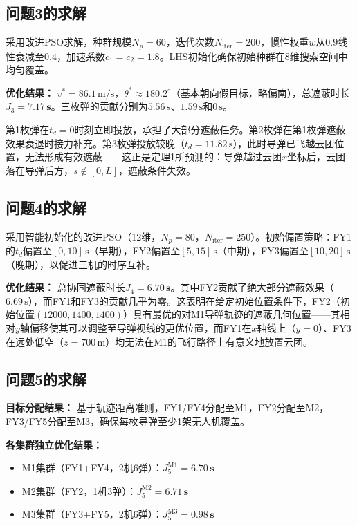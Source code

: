 \documentclass[12pt,a4paper]{ctexart}
\begin{document}
\subsection{问题3的求解}

采用改进PSO求解，种群规模$N_p = 60$，迭代次数$N_{\text{iter}} = 200$，惯性权重$w$从$0.9$线性衰减至$0.4$，加速系数$c_1 = c_2 = 1.8$。LHS初始化确保初始种群在8维搜索空间中均匀覆盖。

\textbf{优化结果：} $v^* = 86.1\,\text{m/s}$，$\theta^* \approx 180.2^\circ$（基本朝向假目标，略偏南），总遮蔽时长$J_3 = \mathbf{7.17\,\text{s}}$。三枚弹的贡献分别为$5.56\,\text{s}$、$1.59\,\text{s}$和$0\,\text{s}$。

第1枚弹在$t_d=0$时刻立即投放，承担了大部分遮蔽任务。第2枚弹在第1枚弹遮蔽效果衰退时接力补充。第3枚弹投放较晚（$t_d=11.82\,\text{s}$），此时导弹已飞越云团位置，无法形成有效遮蔽——这正是定理1所预测的：导弹越过云团$x$坐标后，云团落在导弹后方，$s \notin [0,L]$，遮蔽条件失效。

\subsection{问题4的求解}

采用智能初始化的改进PSO（12维，$N_p=80$，$N_{\text{iter}}=250$）。初始偏置策略：FY1的$t_d$偏置至$[0,10]\,\text{s}$（早期），FY2偏置至$[5,15]\,\text{s}$（中期），FY3偏置至$[10,20]\,\text{s}$（晚期），以促进三机的时序互补。

\textbf{优化结果：} 总协同遮蔽时长$J_4 = \mathbf{6.70\,\text{s}}$。其中FY2贡献了绝大部分遮蔽效果（$6.69\,\text{s}$），而FY1和FY3的贡献几乎为零。这表明在给定初始位置条件下，FY2（初始位置$(12000,1400,1400)$）具有最优的对M1导弹轨迹的遮蔽几何位置——其相对$y$轴偏移使其可以调整至导弹视线的更优位置，而FY1在$x$轴线上（$y=0$）、FY3在远处低空（$z=700\,\text{m}$）均无法在M1的飞行路径上有意义地放置云团。

\subsection{问题5的求解}

\textbf{目标分配结果：} 基于轨迹距离准则，FY1/FY4分配至M1，FY2分配至M2，FY3/FY5分配至M3，确保每枚导弹至少1架无人机覆盖。

\textbf{各集群独立优化结果：}
\begin{itemize}
    \item M1集群（FY1+FY4，2机6弹）：$J_5^{\text{M1}} = \mathbf{6.70\,\text{s}}$
    \item M2集群（FY2，1机3弹）：$J_5^{\text{M2}} = \mathbf{6.71\,\text{s}}$
    \item M3集群（FY3+FY5，2机6弹）：$J_5^{\text{M3}} = \mathbf{0.98\,\text{s}}$
\end{itemize}
\end{document}
